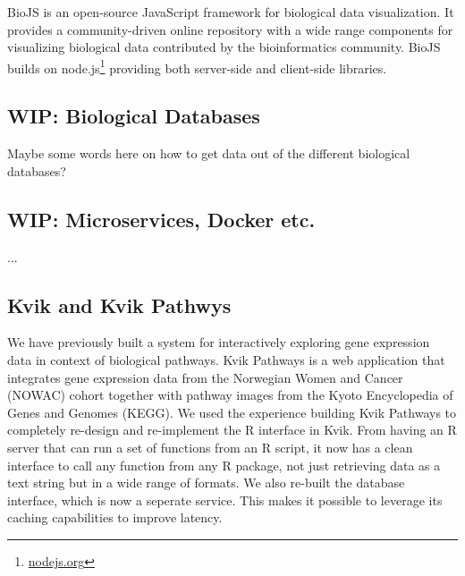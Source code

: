 BioJS is an open-source JavaScript framework for biological data
visualization.\cite{gomez2013biojs} It provides a community-driven online
repository with a wide range components for visualizing biological data
contributed by the bioinformatics community. BioJS builds on
node.js\footnote{\url{nodejs.org}} providing both server-side and client-side
libraries. 


\subsection*{WIP: Biological Databases} 
Maybe some words here on how to get data out of the different biological
databases? 

\subsection*{WIP: Microservices, Docker etc.} 
... 

\subsection*{Kvik and Kvik Pathwys}
We have previously built a system for interactively exploring gene expression
data in context of  biological pathways.\cite{fjukstad2015kvik} Kvik Pathways is
a web application that integrates gene expression data from the Norwegian Women
and Cancer (NOWAC) cohort together with pathway images from the Kyoto
Encyclopedia of Genes and Genomes (KEGG). We used the experience building Kvik
Pathways to completely re-design and re-implement
the R interface in Kvik. From having an R server that can run a set of functions
from an R script, it now has a clean interface to call any function from any R
package, not just retrieving data as a text string but in a wide range of
formats. We also re-built the database interface, which is now a seperate
service. This makes it possible to leverage its caching capabilities to improve
latency. 

